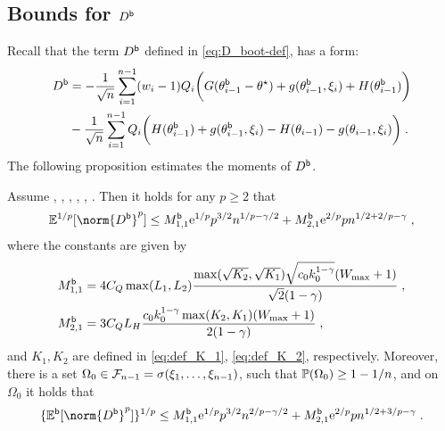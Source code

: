 \subsection{Bounds for $D^{\mathsf{b}}$}
Recall that the term $D^{\mathsf{b}}$ defined in \eqref{eq:D_boot-def}, has a form: 
\begin{equation}
\label{eq:D_boot-def-appendix}
\begin{split}
        D^{\mathsf{b}} &= -\frac{1}{\sqrt{n}}\sum_{i=1}^{n-1}(w_i-1) Q_{i}\biggl( G(\theta_{i-1}^{\mathsf{b}}-\theta^\star) + g(\theta_{i-1}^{\mathsf{b}}, \xi_i) + H(\theta_{i-1}^{\mathsf{b}})\biggr) \\&- \frac{1}{\sqrt{n}}\sum_{i=1}^{n-1}Q_i\biggl(H(\theta_{i-1}^{\mathsf{b}}) +g(\theta_{i-1}^{\mathsf{b}}, \xi_i) -  H(\theta_{i-1}) -g(\theta_{i-1}, \xi_i)\biggr)\;. 
\end{split}
\end{equation}
The following proposition estimates the moments of $D^{\mathsf{b}}$. 
\begin{proposition} \label{prop:prob-D-boot-bound}
Assume , , , , ,  . Then it holds for any $p \geq 2$ that 
\begin{equation}
\label{eq:D-boot-joint-bound}
\PE^{1/p}[\norm{D^\boot}^p] \leq M_{1,1}^{\boot}\rme^{1/p}p^{3/2}n^{1/p-\gamma/2} +  M_{2,1}^{\boot}\rme^{2/p}p n^{1/2+2/p-\gamma}\eqsp,
\end{equation}
where the constants are given by 
\begin{equation}
\label{eq:def_M_11_M_21_boot}
\begin{split} 
&M_{1,1}^{\mathsf{b}} =4C_Q\max(L_1,L_2)\frac{\max(\sqrt{K_2},\sqrt{K_1})\sqrt{c_0k_0^{1-\gamma}}(W_{\max}+1)}{\sqrt{2}(1-\gamma)}\;,\\
& M_{2,1}^{\mathsf{b}}=  3C_QL_H\frac{c_0k_0^{1-\gamma}\max(K_2,K_1)(W_{\max}+1)}{2(1-\gamma)} \;,
\end{split}
\end{equation}
 and $K_1, K_2$ are defined in \eqref{eq:def_K_1}, \eqref{eq:def_K_2}, respectively.
Moreover, there is a set $\Omega_0 \in \mathcal{F}_{n-1} = \sigma(\xi_1,\ldots,\xi_{n-1})$, such that $\mathbb{P}(\Omega_0) \geq 1-1/n$, and on $\Omega_0$ it holds that
\begin{equation}
\label{eq:D-boot-high-prob-bound}
\{\PEb[\norm{D^\boot}^{p}]\}^{1/p} \leq M_{1,1}^{\boot}\rme^{1/p}p^{3/2}n^{2/p-\gamma/2} +  M_{2,1}^{\boot}\rme^{2/p}p n^{1/2+3/p-\gamma}\eqsp.
\end{equation}
\end{proposition}
